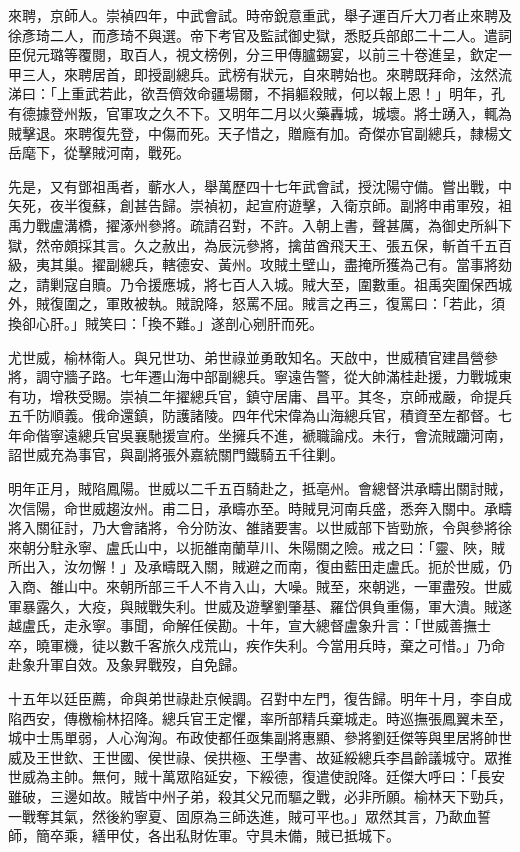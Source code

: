 \begin{pinyinscope}
來聘，京師人。崇禎四年，中武會試。時帝銳意重武，舉子運百斤大刀者止來聘及徐彥琦二人，而彥琦不與選。帝下考官及監試御史獄，悉貶兵部郎二十二人。遣詞臣倪元璐等覆閱，取百人，視文榜例，分三甲傳臚錫宴，以前三十卷進呈，欽定一甲三人，來聘居首，即授副總兵。武榜有狀元，自來聘始也。來聘既拜命，泫然流涕曰：「上重武若此，欲吾儕效命疆場爾，不捐軀殺賊，何以報上恩！」明年，孔有德據登州叛，官軍攻之久不下。又明年二月以火藥轟城，城壞。將士踴入，輒為賊擊退。來聘復先登，中傷而死。天子惜之，贈廕有加。奇傑亦官副總兵，隸楊文岳麾下，從擊賊河南，戰死。

先是，又有鄧祖禹者，蘄水人，舉萬歷四十七年武會試，授沈陽守備。嘗出戰，中矢死，夜半復蘇，創甚告歸。崇禎初，起宣府遊擊，入衛京師。副將申甫軍歿，祖禹力戰盧溝橋，擢涿州參將。疏請召對，不許。入朝上書，聲甚厲，為御史所糾下獄，然帝頗採其言。久之赦出，為辰沅參將，擒苗酋飛天王、張五保，斬首千五百級，夷其巢。擢副總兵，轄德安、黃州。攻賊土壁山，盡掩所獲為己有。當事將劾之，請剿寇自贖。乃令援應城，將七百人入城。賊大至，圍數重。祖禹突圍保西城外，賊復圍之，軍敗被執。賊說降，怒罵不屈。賊言之再三，復罵曰：「若此，須換卻心肝。」賊笑曰：「換不難。」遂剖心剜肝而死。

尤世威，榆林衛人。與兄世功、弟世祿並勇敢知名。天啟中，世威積官建昌營參將，調守牆子路。七年遷山海中部副總兵。寧遠告警，從大帥滿桂赴援，力戰城東有功，增秩受賜。崇禎二年擢總兵官，鎮守居庸、昌平。其冬，京師戒嚴，命提兵五千防順義。俄命還鎮，防護諸陵。四年代宋偉為山海總兵官，積資至左都督。七年命偕寧遠總兵官吳襄馳援宣府。坐擁兵不進，褫職論戍。未行，會流賊躪河南，詔世威充為事官，與副將張外嘉統關門鐵騎五千往剿。

明年正月，賊陷鳳陽。世威以二千五百騎赴之，抵亳州。會總督洪承疇出關討賊，次信陽，命世威趨汝州。甫二日，承疇亦至。時賊見河南兵盛，悉奔入關中。承疇將入關征討，乃大會諸將，令分防汝、雒諸要害。以世威部下皆勁旅，令與參將徐來朝分駐永寧、盧氏山中，以扼雒南蘭草川、朱陽關之險。戒之曰：「靈、陜，賊所出入，汝勿懈！」及承疇既入關，賊避之而南，復由藍田走盧氏。扼於世威，仍入商、雒山中。來朝所部三千人不肯入山，大噪。賊至，來朝逃，一軍盡歿。世威軍暴露久，大疫，與賊戰失利。世威及遊擊劉肇基、羅岱俱負重傷，軍大潰。賊遂越盧氏，走永寧。事聞，命解任侯勘。十年，宣大總督盧象升言：「世威善撫士卒，曉軍機，徒以數千客旅久戍荒山，疾作失利。今當用兵時，棄之可惜。」乃命赴象升軍自效。及象昇戰歿，自免歸。

十五年以廷臣薦，命與弟世祿赴京候調。召對中左門，復告歸。明年十月，李自成陷西安，傳檄榆林招降。總兵官王定懼，率所部精兵棄城走。時巡撫張鳳翼未至，城中士馬單弱，人心洶洶。布政使都任亟集副將惠顯、參將劉廷傑等與里居將帥世威及王世欽、王世國、侯世祿、侯拱極、王學書、故延綏總兵李昌齡議城守。眾推世威為主帥。無何，賊十萬眾陷延安，下綏德，復遣使說降。廷傑大呼曰：「長安雖破，三邊如故。賊皆中州子弟，殺其父兄而驅之戰，必非所願。榆林天下勁兵，一戰奪其氣，然後約寧夏、固原為三師迭進，賊可平也。」眾然其言，乃歃血誓師，簡卒乘，繕甲仗，各出私財佐軍。守具未備，賊已抵城下。


\end{pinyinscope}

